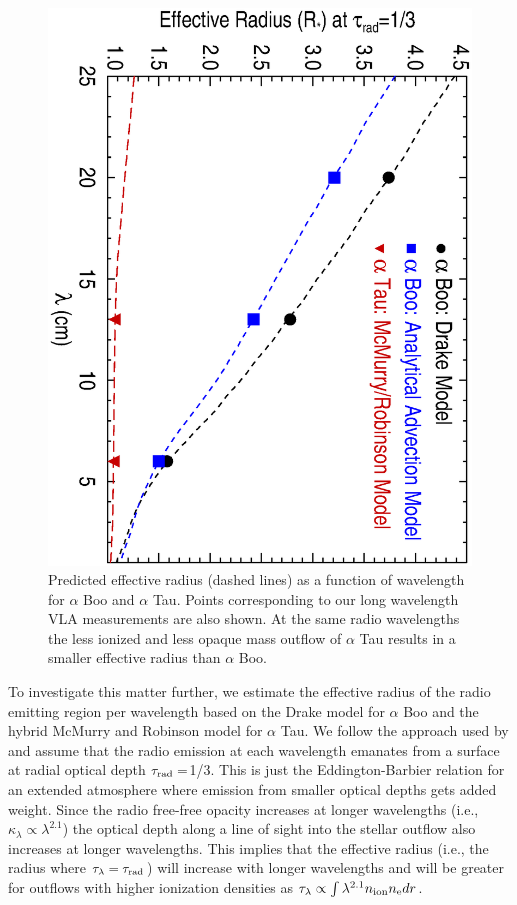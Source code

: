 \documentclass[iop]{emulateapj}
\begin{document}
\begin{figure}
\includegraphics[trim = 5mm 0mm 10mm 20mm, clip,scale=0.4,angle=90]{fig5.ps}
\caption{Predicted effective radius (dashed lines) as a function of wavelength for $\alpha$ Boo and $\alpha$ Tau. Points corresponding to our long wavelength VLA measurements are also shown.  At the same radio wavelengths the less ionized and less opaque mass outflow of $\alpha$ Tau results in a smaller effective radius than $\alpha$ Boo.}
\label{fig:fig5}
\end{figure}

To investigate this matter further,  we estimate the effective radius of the radio emitting region per wavelength based on the Drake model for $\alpha$ Boo and the hybrid McMurry and Robinson model for $\alpha$ Tau. We follow the approach used by \cite{1977ApJ...212..488C} and assume that the radio emission at each wavelength emanates from a surface at radial optical depth $\tau _{\rm{rad}}=$1/3. This is just the Eddington-Barbier relation for an extended atmosphere where emission from smaller optical depths gets added weight. Since the radio free-free opacity increases at longer wavelengths (i.e., $\kappa _{\lambda} \propto \lambda ^{2.1}$) the optical depth along a line of sight into the stellar outflow also increases at longer wavelengths. This implies that the effective radius (i.e., the radius where $\tau _{\lambda} = \tau _{\rm{rad}}$) will increase with longer wavelengths and will be greater for outflows with higher ionization densities as $\tau _{\lambda} \propto \int \lambda ^{2.1}n_{\rm{ion}}n_{\rm{e}} dr$. 
\end{document}
